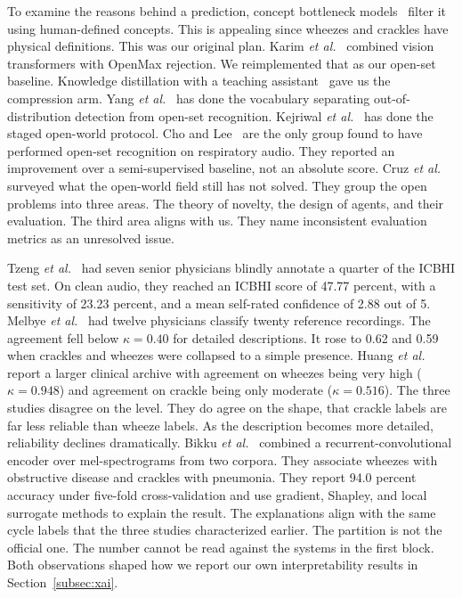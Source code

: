 \documentclass[journal,onecolumn]{IEEEtran}
\begin{document}
To examine the reasons behind a prediction, concept bottleneck
models~\cite{koh2020cbm} filter it using human-defined concepts. This is appealing
since wheezes and crackles have physical definitions. This was our original plan.
Karim \emph{et al.}~\cite{karim2024mosquito} combined vision transformers with OpenMax
rejection. We reimplemented that as our open-set baseline. Knowledge distillation with
a teaching assistant~\cite{pavel2024kd} gave us the compression arm. Yang \emph{et
al.}~\cite{yang2024ood} has done the vocabulary separating out-of-distribution
detection from open-set recognition. Kejriwal \emph{et al.}~\cite{kejriwal2024owl} has
done the staged open-world protocol. Cho and Lee~\cite{cho2025openset} are the only
group found to have performed open-set recognition on respiratory audio. They reported
an improvement over a semi-supervised baseline, not an absolute score. Cruz \emph{et
al.}~\cite{cruz2025owl} surveyed what the open-world field still has not solved. They
group the open problems into three areas. The theory of novelty, the design of agents,
and their evaluation. The third area aligns with us. They name inconsistent evaluation
metrics as an unresolved issue.

Tzeng \emph{et al.}~\cite{tzeng2025jmir} had seven senior physicians blindly annotate a
quarter of the ICBHI test set. On clean audio, they reached an ICBHI score of 47.77
percent, with a sensitivity of 23.23 percent, and a mean self-rated confidence of 2.88
out of 5. Melbye \emph{et al.}~\cite{melbye2016kappa} had twelve physicians classify
twenty reference recordings. The agreement fell below $\kappa = 0.40$ for detailed
descriptions. It rose to 0.62 and 0.59 when crackles and wheezes were collapsed to a
simple presence. Huang \emph{et al.}~\cite{huang2024crackles} report a larger clinical
archive with agreement on wheezes being very high ($\kappa = 0.948$) and agreement on
crackle being only moderate ($\kappa = 0.516$). The three studies disagree on the
level. They do agree on the shape, that crackle labels are far less reliable than
wheeze labels. As the description becomes more detailed, reliability declines
dramatically. Bikku \emph{et al.}~\cite{scirep2025cnnrnn} combined a recurrent-convolutional 
encoder over mel-spectrograms from two corpora. They associate wheezes
with obstructive disease and crackles with pneumonia. They report 94.0 percent accuracy
under five-fold cross-validation and use gradient, Shapley, and local surrogate methods
to explain the result. The explanations align with the same cycle labels that the three
studies characterized earlier. The partition is not the official one. The number
cannot be read against the systems in the first block. Both observations shaped how we
report our own interpretability results in Section~\ref{subsec:xai}.
\end{document}
